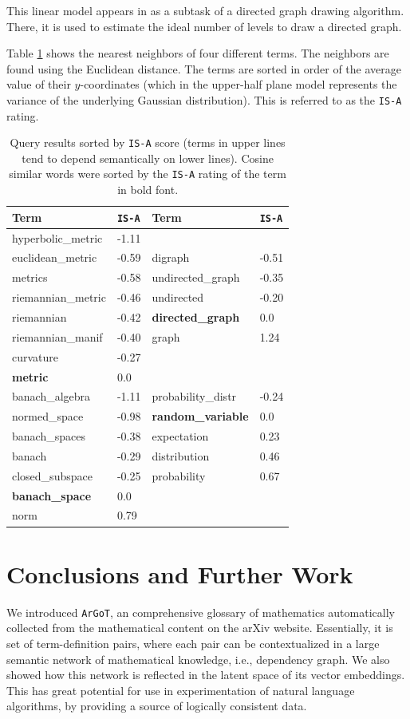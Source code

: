 \documentclass[submission,copyright,creativecommons]{eptcs}
\newcommand{\argot}{\texttt{ArGoT}\xspace}
\newcommand{\isa}{\texttt{IS-A}\xspace}
\begin{document}
This linear model appears in \cite{DBLP:journals/tse/GansnerKNV93} as a subtask of a directed graph drawing algorithm. There, it is used to estimate the ideal number of levels to draw a directed graph. 


Table \ref{tab:hypernyny} shows the nearest neighbors of four
different terms.  The neighbors are found using the Euclidean distance. 
The terms are 
sorted in order of the average value of their $y$-coordinates (which in
the upper-half plane model represents the variance of the underlying
Gaussian distribution). This is referred to as the \isa rating. 


\begin{table}
    \small
\centering
\begin{tabular}{ll|ll}
    \hline \textbf{Term} &  \isa &  
    \textbf{Term} &  \isa \\ \hline
    hyperbolic\_metric & -1.11 &  &\\
euclidean\_metric & -0.59  & digraph & -0.51 \\
metrics & -0.58 & undirected\_graph & -0.35 \\
riemannian\_metric & -0.46  &  undirected & -0.20 \\
riemannian & -0.42  & \textbf{directed\_graph} &  0.0\\
riemannian\_manif & -0.40 & graph & 1.24 \\
curvature & -0.27  & & \\
\textbf{metric} & 0.0 & & \\
\hline
banach\_algebra & -1.11  & probability\_distr & -0.24 \\
normed\_space & -0.98 & \textbf{random\_variable} & 0.0 \\
banach\_spaces & -0.38 & expectation & 0.23 \\
banach & -0.29  & distribution & 0.46 \\
closed\_subspace & -0.25 & probability & 0.67 \\
\textbf{banach\_space} & 0.0 & & \\
norm & 0.79 & & \\

\end{tabular}
\caption{\label{tab:hypernyny} 
   Query results sorted by \isa score (terms in upper lines tend to depend semantically on lower lines).  Cosine similar words were sorted by the
    \isa rating of the term in bold font. }
\end{table}

\section{Conclusions and Further Work}
We introduced \argot, an comprehensive glossary of mathematics
automatically collected from the mathematical content on the arXiv website. 
Essentially, it is set of term-definition pairs, where 
each pair can be contextualized in a large semantic network of
mathematical knowledge, i.e., dependency graph. We also showed how this 
network is reflected in the latent space of its vector embeddings. This
has great potential for use in experimentation of natural language
algorithms, by providing a source of logically consistent data. 
\end{document}
